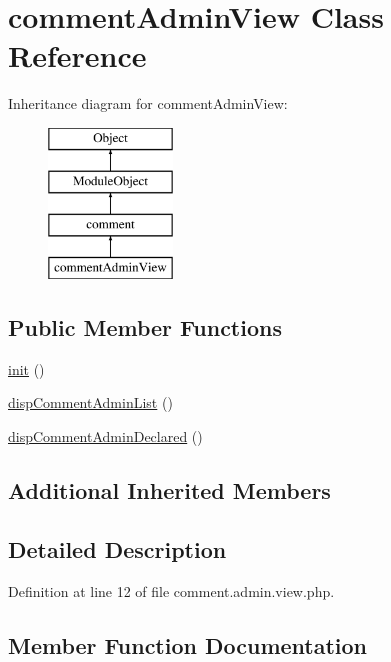 \hypertarget{classcommentAdminView}{}\section{comment\+Admin\+View Class Reference}
\label{classcommentAdminView}
Inheritance diagram for comment\+Admin\+View\+:\begin{figure}[H]
\begin{center}
\leavevmode
\includegraphics[height=4.000000cm]{classcommentAdminView}
\end{center}
\end{figure}
\subsection*{Public Member Functions}
\begin{DoxyCompactItemize}
\item 
\hyperlink{classcommentAdminView_a61733eebabe2434e133bbd516d8f68c5}{init} ()
\item 
\hyperlink{classcommentAdminView_a979a3095a55ec0e9356db470c6425639}{disp\+Comment\+Admin\+List} ()
\item 
\hyperlink{classcommentAdminView_affef73848f5ace73892e3a771d2765f5}{disp\+Comment\+Admin\+Declared} ()
\end{DoxyCompactItemize}
\subsection*{Additional Inherited Members}


\subsection{Detailed Description}


Definition at line 12 of file comment.\+admin.\+view.\+php.



\subsection{Member Function Documentation}
\hypertarget{classcommentAdminView_affef73848f5ace73892e3a771d2765f5}{}\label{classcommentAdminView_affef73848f5ace73892e3a771d2765f5} 
